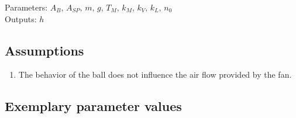 \documentclass[10pt,a4paper]{article}
\begin{document}
	\noindent
	Parameters: $A_B, \, A_{SP}, \, m, \, g, \, T_M, \, k_M, \, k_V, \, k_L, \, n_0$ %
	\\
	Outputs: $h$ \\ 
	
	
	\subsection{Assumptions} %
		\begin{enumerate} %
			\item The behavior of the ball does not influence the air flow provided by the fan. 
		\end{enumerate}
	
	
	\subsection{Exemplary parameter values}
	

	
\end{document}

